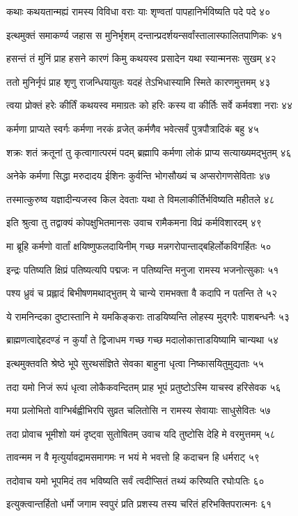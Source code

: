 कथाः कथयतान्मह्यं रामस्य विविधा वराः
याः शृण्वतां पापहानिर्भविष्यति पदे पदे ४०

इत्थमुक्तं समाकर्ण्य जहास स मुनिर्भृशम्
दन्तान्प्रदर्शयन्सर्वांस्तालास्फालितपाणिकः ४१

हसन्तं तं मुनिं प्राह हसने कारणं किमु
कथयस्व प्रसादेन यथा स्यान्मनसः सुखम् ४२

ततो मुनिर्नृपं प्राह शृणु राजन्धियायुतः
यदहं तेऽभिधास्यामि स्मिते कारणमुत्तमम् ४३

त्वया प्रोक्तं हरेः कीर्तिं कथयस्व ममाग्रतः
को हरिः कस्य वा कीर्तिः सर्वे कर्मवशा नराः ४४

कर्मणा प्राप्यते स्वर्गः कर्मणा नरकं व्रजेत्
कर्मणैव भवेत्सर्वं पुत्रपौत्रादिकं बहु ४५

शक्रः शतं क्रतूनां तु कृत्वागात्परमं पदम्
ब्रह्मापि कर्मणा लोकं प्राप्य सत्याख्यमद्भुतम् ४६

अनेके कर्मणा सिद्धा मरुदादय ईशिनः
कुर्वन्ति भोगसौख्यं च अप्सरोगणसेविताः ४७

तस्मात्कुरुष्व यज्ञादीन्यजस्व किल देवताः
यथा ते विमलाकीर्तिर्भविष्यति महीतले ४८

इति श्रुत्वा तु तद्वाक्यं कोपक्षुभितमानसः
उवाच रामैकमना विप्रं कर्मविशारदम् ४९

मा ब्रूहि कर्मणो वार्तां क्षयिष्णुफलदायिनीम्
गच्छ मन्नगरोपान्ताद्बहिर्लोकविगर्हितः ५०

इन्द्रः पतिष्यति क्षिप्रं पतिष्यत्यपि पद्मजः
न पतिष्यन्ति मनुजा रामस्य भजनोत्सुकाः ५१

पश्य ध्रुवं च प्रह्लादं बिभीषणमथाद्भुतम्
ये चान्ये रामभक्ता वै कदापि न पतन्ति ते ५२

ये रामनिन्दका दुष्टास्तानि मे यमकिङ्कराः
ताडयिष्यन्ति लोहस्य मुद्गरैः पाशबन्धनैः ५३

ब्राह्मणत्वाद्देहदण्डं न कुर्यां ते द्विजाधम
गच्छ गच्छ मदालोकात्ताडयिष्यामि चान्यथा ५४

इत्थमुक्तवति श्रेष्ठे भूपे सुरथसंज्ञिते
सेवका बाहुना धृत्वा निष्कासयितुमुद्यताः ५५

तदा यमो निजं रूपं धृत्वा लोकैकवन्दितम्
प्राह भूपं प्रतुष्टोऽस्मि याचस्व हरिसेवक ५६

मया प्रलोभितो वाग्भिर्बह्वीभिरपि सुव्रत
चलितोसि न रामस्य सेवायाः साधुसेवितः ५७

तदा प्रोवाच भूमीशो यमं दृष्ट्वा सुतोषितम्
उवाच यदि तुष्टोसि देहि मे वरमुत्तमम् ५८

तावन्मम न वै मृत्युर्यावद्रामसमागमः
न भयं मे भवत्तो हि कदाचन हि धर्मराट् ५९

तदोवाच यमो भूपमिदं तव भविष्यति
सर्वं त्वदीप्सितं तथ्यं करिष्यति रघोःपतिः ६०

इत्युक्त्वान्तर्हितो धर्मो जगाम स्वपुरं प्रति
प्रशस्य तस्य चरितं हरिभक्तिपरात्मनः ६१

